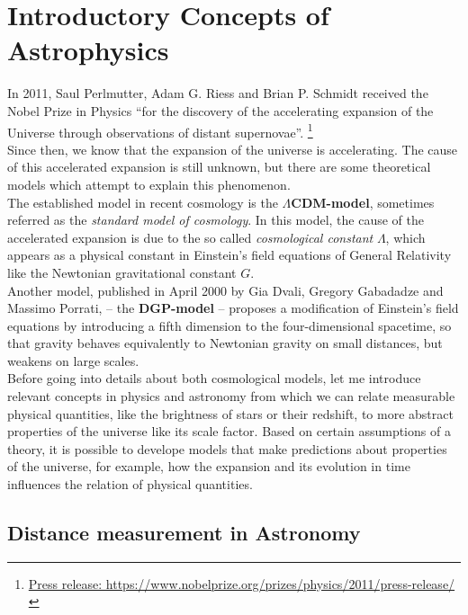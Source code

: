 \chapter{Introductory Concepts of Astrophysics}
\thispagestyle{empty}

In 2011, Saul Perlmutter, Adam G. Riess and Brian P. Schmidt received the Nobel Prize in Physics \enquote{for the discovery of the accelerating expansion of the Universe through observations of distant supernovae}. \footnote{\href{https://www.nobelprize.org/prizes/physics/2011/press-release/}{Press release: https://www.nobelprize.org/prizes/physics/2011/press-release/}} \\
Since then, we know that the expansion of the universe is accelerating.
The cause of this accelerated expansion is still unknown, but there are some theoretical models which attempt to explain this phenomenon. \\

\noindent The established model in recent cosmology is the \textbf{$\Lambda$CDM-model}, sometimes referred as the \textit{standard model of cosmology}.
In this model, the cause of the accelerated expansion is due to the so called \textit{cosmological constant} $\Lambda$, which appears as a physical constant in Einstein's field equations of General Relativity like the Newtonian gravitational constant $G$. \\

\noindent Another model, published in April 2000 by Gia Dvali, Gregory Gabadadze and Massimo Porrati, -- the \textbf{DGP-model} -- proposes a modification of Einstein's field equations by introducing a fifth dimension to the four-dimensional spacetime, so that gravity behaves equivalently to Newtonian gravity on small distances, but weakens on large scales. \\


\noindent Before going into details about both cosmological models, let me introduce relevant concepts in physics and astronomy from which we can relate measurable physical quantities, like the brightness of stars or their redshift, to more abstract properties of the universe like its scale factor. Based on certain assumptions of a theory, it is possible to develope models that make predictions about properties of the universe, for example, how the expansion and its evolution in time influences the relation of physical quantities.



\section{Distance measurement in Astronomy}

